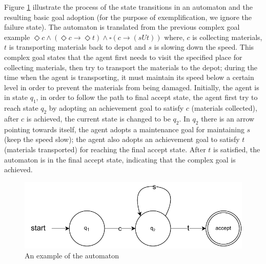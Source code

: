 \documentclass{article}
\begin{document}
Figure \ref{fig:auto} illustrate the process of the state transitions in an automaton and the resulting basic goal adoption (for the purpose of exemplification, we ignore the failure state). The automaton is translated from the previous complex goal example $\Diamond c \land (\Diamond c \rightarrow \Diamond t) \land \square (c \rightarrow (s{U} t))$ where, $c$ is collecting materials, $t$ is transporting materials back to depot and $s$ is slowing down the speed. This complex goal states that the agent first needs to visit the specified place for collecting materials, then try to transport the materials to the depot; during the time when the agent is transporting, it must maintain its speed below a certain level in order to prevent the materials from being damaged. Initially, the agent is in state $q_1$, in order to follow the path to final accept state, the agent first try to reach state $q_2$ by adopting an achievement goal to satisfy $c$ (materials collected), after $c$ is achieved, the current state is changed to be $q_2$. In $q_2$ there is an arrow pointing towards itself, the agent adopts a maintenance goal for maintaining $s$ (keep the speed slow); the agent also adopts an achievement goal to satisfy $t$ (materials transported) for reaching the final accept state. After $t$ is satisfied, the automaton is in the final accept state, indicating that the complex goal is achieved.
\begin{figure}[H]
    \centering
    \includegraphics[scale=0.8]{auto_example.pdf}
    \caption{An example of the automaton}
    \label{fig:auto}
\end{figure}
\end{document}
